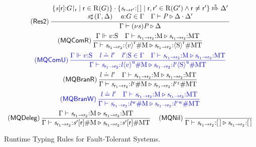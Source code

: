 \begin{figure}[tp]
	\[ \begin{array}{c}
		\left( \textsf{Res2} \right) \dfrac{\!\!\begin{array}{c} \Set{ \Typed{\AT{\Chan}{\Role}}{\Proj{\GT}{\Role}} \mid \Role \in \Roles{\GT} } \compS \Set{ \MQ{\Chan}{\Role}{\Role'}{\emptyList} \mid \Role, \Role' \in \Roles{\GT'} \wedge \Role \neq \Role' } \stackrel{\Chan}{\Mapsto} \Delta'\\ \Chan \sharp \left(\Gamma, \Delta \right) \quad \Typed{\Chan[a]}{G} \in \Gamma \quad \Gamma \vdash \PT \triangleright \Delta \compS \Delta' \end{array}\!\!}{\Gamma \vdash \PRes{\Chan[s]}{\PT} \triangleright \Delta} \vspace{0.5em}\\
		\left( \textsf{MQComR} \right) \dfrac{\Gamma \Vdash \Typed{\Expr[v]}{\Sort} \quad \Gamma \vdash \MQ{\Chan}{\Role_1}{\Role_2}{\Queue} \triangleright \MQ{\Chan}{\Role_1}{\Role_2}{\MT}}{\Gamma \vdash \MQ{\Chan}{\Role_1}{\Role_2}{\MessR{\Expr[v]}\#\Queue} \triangleright \MQ{\Chan}{\Role_1}{\Role_2}{\MessR{\Sort}\#\MT}} \vspace{0.5em}\\
		\textcolor{blue}{\left( \textsf{MQComU} \right) \dfrac{\Gamma \Vdash \Typed{\Expr[v]}{\Sort} \quad \Label \compL \Label' \quad \Typed{\Label'}{\Sort} \in \Gamma \quad \Gamma \vdash \MQ{\Chan}{\Role_1}{\Role_2}{\Queue} \triangleright \MQ{\Chan}{\Role_1}{\Role_2}{\MT}}{\Gamma \vdash \MQ{\Chan}{\Role_1}{\Role_2}{\MessU{\Label}{\Expr[v]}\#\Queue} \triangleright \MQ{\Chan}{\Role_1}{\Role_2}{\MessU{\Label'}{\Sort}\#\MT}}} \vspace{0.5em}\\
		\left( \textsf{MQBranR} \right) \dfrac{\Label \compL \Label' \quad \Gamma \vdash \MQ{\Chan}{\Role_1}{\Role_2}{\Queue} \triangleright \MQ{\Chan}{\Role_1}{\Role_2}{\MT}}{\Gamma \vdash \MQ{\Chan}{\Role_1}{\Role_2}{\MessBR{\Label}\#\Queue} \triangleright \MQ{\Chan}{\Role_1}{\Role_2}{\MessBR{\Label'}\#\MT}} \vspace{0.5em}\\
		\textcolor{blue}{\left( \textsf{MQBranW} \right) \dfrac{\Label \compL \Label' \quad \Gamma \vdash \MQ{\Chan}{\Role_1}{\Role_2}{\Queue} \triangleright \MQ{\Chan}{\Role_1}{\Role_2}{\MT}}{\Gamma \vdash \MQ{\Chan}{\Role_1}{\Role_2}{\MessBW{\Label}\#\Queue} \triangleright \MQ{\Chan}{\Role_1}{\Role_2}{\MessBW{\Label'}\#\MT}}} \vspace{0.5em}\\
		\left( \textsf{MQDeleg} \right) \dfrac{\Gamma \vdash \MQ{\Chan}{\Role_1}{\Role_2}{\Queue} \triangleright \MQ{\Chan}{\Role_1}{\Role_2}{\MT}}{\Gamma \vdash \MQ{\Chan}{\Role_1}{\Role_2}{\AT{\Chan'}{\Role}\#\Queue} \triangleright \MQ{\Chan}{\Role_1}{\Role_2}{\AT{\Chan'}{\Role}\#\MT}} \hspace{1em}
		\left( \textsf{MQNil} \right) \dfrac{}{\Gamma \vdash \MQ{\Chan}{\Role_1}{\Role_2}{\emptyList} \triangleright \MQ{\Chan}{\Role_1}{\Role_2}{\emptyList}}
	\end{array} \]
	\caption{Runtime Typing Rules for Fault-Tolerant Systems.}
	\label{fig:runtimeTypingRules}
\end{figure}

